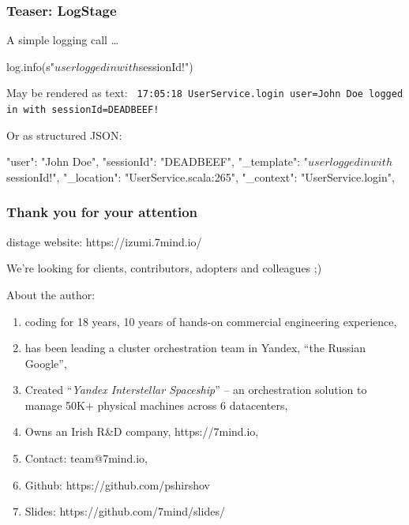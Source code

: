 \documentclass[usenames,dvipsnames]{beamer}
\begin{document}
\begin{frame}[fragile]
  \frametitle{Teaser: LogStage}
  A simple logging call \dots
  \begin{scalacode}
log.info(s"$user logged in with $sessionId!")
  \end{scalacode}

  May be rendered as text:
  \newline
  \texttt{
  17:05:18 UserService.login user=John Doe logged in with sessionId=DEADBEEF!
  }
  \newline

  Or as structured JSON:
  \begin{jsoncode}
{
  "user": "John Doe",
  "sessionId": "DEADBEEF",
  "_template": "$user logged in with $sessionId!",
  "_location": "UserService.scala:265",
  "_context": "UserService.login",
}
  \end{jsoncode}
\end{frame}

\begin{frame}
    \frametitle{Thank you for your attention}

    \begin{center}
      distage website: https://izumi.7mind.io/

      We're looking for clients, contributors, adopters and colleagues ;)
    \end{center}

    About the author:
    \begin{enumerate}
        \item coding for 18 years, 10 years of hands-on commercial engineering experience,
        \item has been leading a cluster orchestration team in Yandex, ``the Russian Google'',
        \item Created ``\textit{Yandex Interstellar Spaceship}'' -- an orchestration solution to manage 50K+ physical machines across 6 datacenters,
        \item Owns an Irish R\&D company, https://7mind.io,
        \item Contact: team@7mind.io,
        \item Github: https://github.com/pshirshov
        \item Slides: https://github.com/7mind/slides/
    \end{enumerate}
\end{frame}
\end{document}
